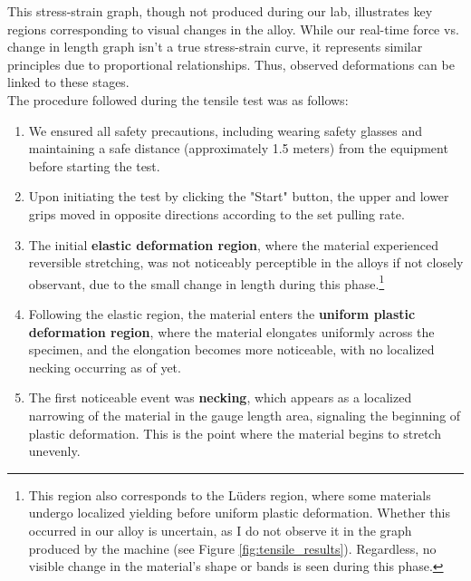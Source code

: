 \documentclass{article}
\begin{document}
This stress-strain graph, though not produced during our lab, illustrates key regions corresponding to visual changes in the alloy. While our real-time force vs. change in length graph isn't a true stress-strain curve, it represents similar principles due to proportional relationships. Thus, observed deformations can be linked to these stages.\\[8pt]
The procedure followed during the tensile test was as follows: 
\begin{enumerate}
    \item We ensured all safety precautions, including wearing safety glasses and maintaining a safe distance (approximately 1.5 meters) from the equipment before starting the test.
    \item Upon initiating the test by clicking the "Start" button, the upper and lower grips moved in opposite directions according to the set pulling rate.
    \item The initial \textbf{elastic deformation region}, where the material experienced reversible stretching, was not noticeably perceptible in the alloys if not closely observant, due to the small change in length during this phase.\footnote{This region also corresponds to the Lüders region, where some materials undergo localized yielding before uniform plastic deformation. Whether this occurred in our alloy is uncertain, as I do not observe it in the graph produced by the machine (see Figure \ref{fig:tensile_results}). Regardless, no visible change in the material's shape or bands is seen during this phase.}
    \item Following the elastic region, the material enters the \textbf{uniform plastic deformation region}, where the material elongates uniformly across the specimen, and the elongation becomes more noticeable, with no localized necking occurring as of yet.
    \item The first noticeable event was \textbf{necking}, which appears as a localized narrowing of the material in the gauge length area, signaling the beginning of plastic deformation. This is the point where the material begins to stretch unevenly.
\end{enumerate}
\newpage
\end{document}
